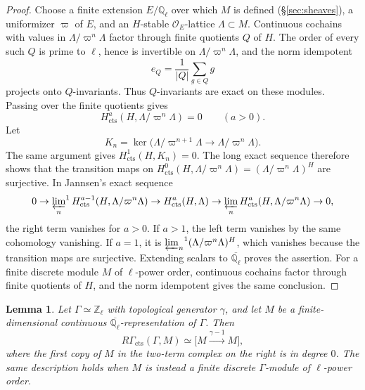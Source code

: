 \documentclass[12pt,reqno]{amsart}
\theoremstyle{definition}
\theoremstyle{plain}
\newtheorem{lem}[para]{Lemma}
\theoremstyle{definition}
\theoremstyle{remark}
\newcommand{\bbQ}{\mathbb{Q}}  \newcommand{\bbR}{\mathbb{R}}
\newcommand{\ol}[1]{\overline{#1}}
\newcommand{\Ql}{\bbQ_{\ell}}
\begin{document}
\begin{proof}
Choose a finite extension \(E/\mathbb Q_\ell\) over which \(M\) is defined
(\S\ref{sec:sheaves}), a uniformizer \(\varpi\) of \(E\), and an \(H\)-stable
\(\mathcal O_E\)-lattice \(\Lambda\subset M\).  Continuous cochains with
values in \(\Lambda/\varpi^n\Lambda\) factor through finite quotients \(Q\) of \(H\).  The order of every
such \(Q\) is prime to \(\ell\), hence is invertible on \(\Lambda/\varpi^n\Lambda\), and the norm
idempotent
\[
        e_Q=\frac{1}{\lvert Q\rvert}\sum_{g\in Q}g
\]
projects onto \(Q\)-invariants.  Thus \(Q\)-invariants are exact on these modules.  Passing over the
finite quotients gives
\[
        H^a_{\mathrm{cts}}(H,\Lambda/\varpi^n\Lambda)=0
        \qquad(a>0).
\]
Let
\[
 K_n=\ker\bigl(\Lambda/\varpi^{n+1}\Lambda\longrightarrow\Lambda/\varpi^n\Lambda\bigr).
\]
The same argument gives \(H^1_{\mathrm{cts}}(H,K_n)=0\).  The long exact sequence therefore shows
that the transition maps on
\(H^0_{\mathrm{cts}}(H,\Lambda/\varpi^n\Lambda)=(\Lambda/\varpi^n\Lambda)^H\) are surjective.  In
Jannsen's exact sequence
\cite[(2.1)]{Jannsen88}
\[
        0\to{\varprojlim_n}^{1}\,H^{a-1}_{\mathrm{cts}}(H,\Lambda/\varpi^n\Lambda)
        \to H^a_{\mathrm{cts}}(H,\Lambda)
        \to\varprojlim_n H^a_{\mathrm{cts}}(H,\Lambda/\varpi^n\Lambda)\to0,
\]
the right term vanishes for \(a>0\).  If \(a>1\), the left term vanishes by the same cohomology
vanishing.  If \(a=1\), it is
\({\varprojlim_n}^{1}(\Lambda/\varpi^n\Lambda)^H\), which vanishes because the transition maps are
surjective.  Extending scalars to \(\ol\Ql\) proves the assertion.  For a finite discrete module \(M\)
of \(\ell\)-power order, continuous cochains factor through finite quotients of \(H\), and the norm
idempotent gives the same conclusion.
\end{proof}

\begin{lem}
\label{lem:zell-cohomology}
Let \(\Gamma\simeq\mathbb Z_\ell\) with topological generator \(\gamma\), and let \(M\) be a
finite-dimensional continuous \(\ol\Ql\)-representation of \(\Gamma\).  Then
\[
        R\Gamma_{\mathrm{cts}}(\Gamma,M)
        \simeq
        \bigl[M\xrightarrow{\gamma-1}M\bigr],
\]
where the first copy of \(M\) in the two-term complex on the right is in degree \(0\).
The same description holds when \(M\) is instead a finite discrete \(\Gamma\)-module of \(\ell\)-power
order.
\end{lem}
\end{document}
